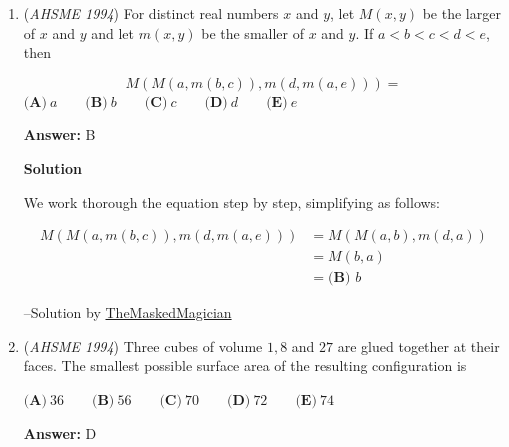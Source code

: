 \begin{enumerate}
 \textbf{Answer: }D



\textbf{Solution}

Let $\angle A=x$ and $\angle B=y$. From the first condition, we have $x=4y$. From the second condition, we have 
 \[90-y=4(90-x).\] Substituting $x=4y$ into the previous equation and solving yields 
 \begin{align*}90-y=4(90-4y)&\implies 90-y=360-16y\\&\implies 15y=270\\&\implies y=\boxed{\textbf{(D) }18^\circ.}\end{align*}


 --Solution by \href{https://artofproblemsolving.comhttp://www.artofproblemsolving.com/Forum/memberlist.php?mode=viewprofile&u=200685}{TheMaskedMagician}

 


	\item (\textit{AHSME 1994}) For distinct real numbers $x$ and $y$, let $M(x,y)$ be the larger of $x$ and $y$ and let $m(x,y)$ be the smaller of $x$ and $y$. If $a<b<c<d<e$, then

 \[M(M(a,m(b,c)),m(d,m(a,e)))=\]
$\textbf{(A)}\ a \qquad\textbf{(B)}\ b \qquad\textbf{(C)}\ c \qquad\textbf{(D)}\ d \qquad\textbf{(E)}\ e$

 \textbf{Answer: }B



\textbf{Solution}

We work thorough the equation step by step, simplifying as follows:

 
 \begin{align*}M(M(a,m(b,c)),m(d,m(a,e)))&=M(M(a,b),m(d,a))\\&=M(b,a)\\&=\boxed{\textbf{(B) }b}\end{align*}


 --Solution by \href{https://artofproblemsolving.comhttp://www.artofproblemsolving.com/Forum/memberlist.php?mode=viewprofile&u=200685}{TheMaskedMagician}

 


	\item (\textit{AHSME 1994}) Three cubes of volume $1, 8$ and $27$ are glued together at their faces. The smallest possible surface area of the resulting configuration is


 $\textbf{(A)}\ 36 \qquad\textbf{(B)}\ 56 \qquad\textbf{(C)}\ 70 \qquad\textbf{(D)}\ 72 \qquad\textbf{(E)}\ 74$

 \textbf{Answer: }D




\end{enumerate}
